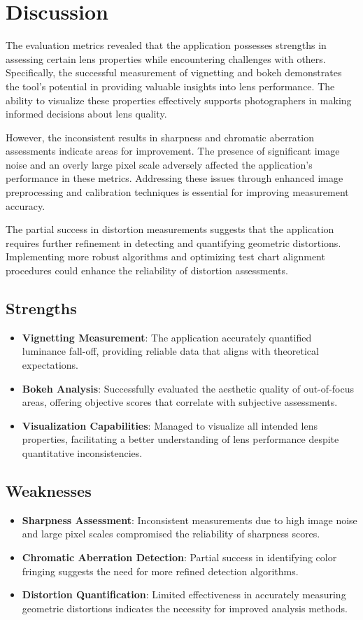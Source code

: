 \section{Discussion}
The evaluation metrics revealed that the application possesses strengths in assessing certain lens properties while encountering challenges with others. Specifically, the successful measurement of vignetting and bokeh demonstrates the tool's potential in providing valuable insights into lens performance. The ability to visualize these properties effectively supports photographers in making informed decisions about lens quality.

However, the inconsistent results in sharpness and chromatic aberration assessments indicate areas for improvement. The presence of significant image noise and an overly large pixel scale adversely affected the application's performance in these metrics. Addressing these issues through enhanced image preprocessing and calibration techniques is essential for improving measurement accuracy.

The partial success in distortion measurements suggests that the application requires further refinement in detecting and quantifying geometric distortions. Implementing more robust algorithms and optimizing test chart alignment procedures could enhance the reliability of distortion assessments.

\subsection{Strengths}
\begin{itemize}
    \item \textbf{Vignetting Measurement}: The application accurately quantified luminance fall-off, providing reliable data that aligns with theoretical expectations.
    \item \textbf{Bokeh Analysis}: Successfully evaluated the aesthetic quality of out-of-focus areas, offering objective scores that correlate with subjective assessments.
    \item \textbf{Visualization Capabilities}: Managed to visualize all intended lens properties, facilitating a better understanding of lens performance despite quantitative inconsistencies.
\end{itemize}

\subsection{Weaknesses}
\begin{itemize}
    \item \textbf{Sharpness Assessment}: Inconsistent measurements due to high image noise and large pixel scales compromised the reliability of sharpness scores.
    \item \textbf{Chromatic Aberration Detection}: Partial success in identifying color fringing suggests the need for more refined detection algorithms.
    \item \textbf{Distortion Quantification}: Limited effectiveness in accurately measuring geometric distortions indicates the necessity for improved analysis methods.
\end{itemize}

